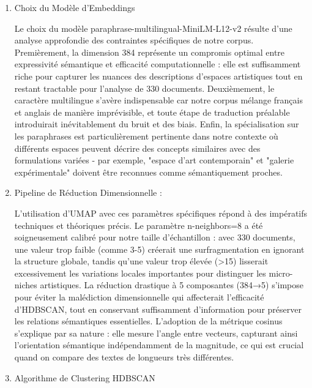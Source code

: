 \documentclass[mstat,12pt]{unswthesis}
\begin{document}
\begin{enumerate}
    \item Choix du Modèle d'Embeddings
    
    \bigskip

    Le choix du modèle paraphrase-multilingual-MiniLM-L12-v2 résulte d'une analyse
    approfondie des contraintes spécifiques de notre corpus. Premièrement, la dimension 384
    représente un compromis optimal entre expressivité sémantique et efficacité
    computationnelle : elle est suffisamment riche pour capturer les nuances des descriptions
    d'espaces artistiques tout en restant tractable pour l'analyse de 330 documents.
    Deuxièmement, le caractère multilingue s'avère indispensable car notre corpus mélange
    français et anglais de manière imprévisible, et toute étape de traduction préalable
    introduirait inévitablement du bruit et des biais. Enfin, la spécialisation sur les paraphrases
    est particulièrement pertinente dans notre contexte où différents espaces peuvent décrire
    des concepts similaires avec des formulations variées - par exemple, "espace d'art
    contemporain" et "galerie expérimentale" doivent être reconnues comme sémantiquement
    proches.

    \bigskip

    \item Pipeline de Réduction Dimensionnelle :
    
    \bigskip

    L'utilisation d'UMAP avec ces paramètres spécifiques répond à des impératifs techniques et
    théoriques précis. Le paramètre n-neighbors=8 a été soigneusement calibré pour notre taille
    d'échantillon : avec 330 documents, une valeur trop faible (comme 3-5) créerait une surfragmentation en ignorant la structure globale, tandis qu'une valeur trop élevée (>15)
    lisserait excessivement les variations locales importantes pour distinguer les micro-niches
    artistiques. La réduction drastique à 5 composantes (384→5) s'impose pour éviter la
    malédiction dimensionnelle qui affecterait l'efficacité d'HDBSCAN, tout en conservant
    suffisamment d'information pour préserver les relations sémantiques essentielles.
    L'adoption de la métrique cosinus s'explique par sa nature : elle mesure l'angle entre
    vecteurs, capturant ainsi l'orientation sémantique indépendamment de la magnitude, ce qui
    est crucial quand on compare des textes de longueurs très différentes.

    \bigskip


    \item Algorithme de Clustering HDBSCAN


\end{enumerate}
\end{document}
